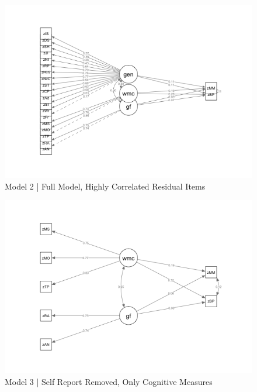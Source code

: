\documentclass[12pt,]{book}
\begin{document}
\begin{figure}

{\centering \includegraphics[width=1\linewidth]{img/sem2} 

}

\caption{Model 2 | Full Model, Highly Correlated Residual Items}\label{fig:model2}
\end{figure}

\begin{figure}

{\centering \includegraphics[width=1\linewidth]{img/sem3} 

}

\caption{Model 3 | Self Report Removed, Only Cognitive Measures}\label{fig:model3}
\end{figure}
\end{document}
